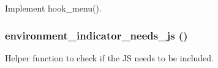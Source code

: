 \label{environment__indicator_8module_a2bd8a22de9eff55b8b81e063f715c60d}
Implement hook\_\-menu(). \hypertarget{environment__indicator_8module_a177431cf8784daef5b7e3a5ba3fd0702}{
\subsubsection[{environment\_\-indicator\_\-needs\_\-js}]{\setlength{\rightskip}{0pt plus 5cm}environment\_\-indicator\_\-needs\_\-js ()}}
\label{environment__indicator_8module_a177431cf8784daef5b7e3a5ba3fd0702}
Helper function to check if the JS needs to be included.

